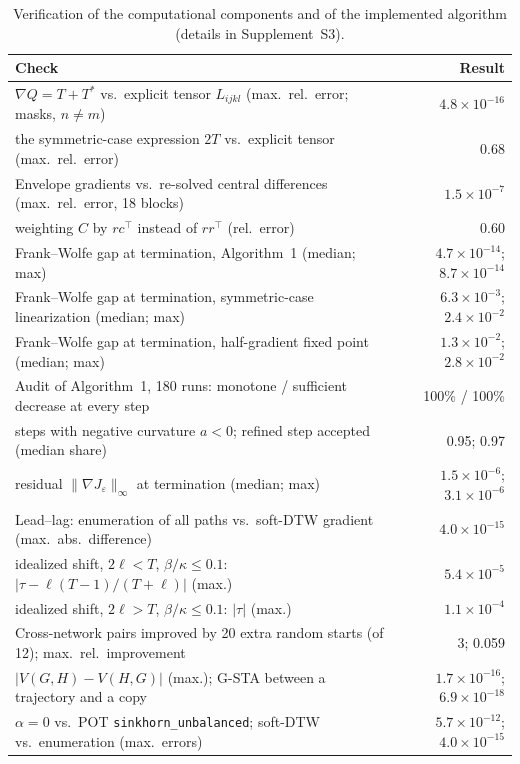 \documentclass[12pt]{article}
\theoremstyle{definition}
\begin{document}
\begin{table}[hp]
\caption{Verification of the computational components and of the implemented algorithm (details in Supplement~S3).}\label{tab:verif}
\centering\scriptsize
\begin{tabular}{lr}
\toprule
Check & Result\\
\midrule
$\nabla Q=T+T^\ast$ vs.\ explicit tensor $L_{ijkl}$ (max.\ rel.\ error; masks, $n\ne m$) & $4.8\times10^{-16}$\\
\quad the symmetric-case expression $2T$ vs.\ explicit tensor (max.\ rel.\ error) & 0.68\\
Envelope gradients vs.\ re-solved central differences (max.\ rel.\ error, 18 blocks) & $1.5\times10^{-7}$\\
\quad weighting $C$ by $rc^\top$ instead of $rr^\top$ (rel.\ error) & 0.60\\
Frank--Wolfe gap at termination, Algorithm~1 (median; max) & $4.7\times10^{-14}$; $8.7\times10^{-14}$\\
Frank--Wolfe gap at termination, symmetric-case linearization (median; max) & $6.3\times10^{-3}$; $2.4\times10^{-2}$\\
Frank--Wolfe gap at termination, half-gradient fixed point (median; max) & $1.3\times10^{-2}$; $2.8\times10^{-2}$\\
Audit of Algorithm~1, 180 runs: monotone / sufficient decrease at every step & 100\% / 100\%\\
\quad steps with negative curvature $a<0$; refined step accepted (median share) & 0.95; 0.97\\
\quad residual $\|\nabla J_\varepsilon\|_\infty$ at termination (median; max) & $1.5\times10^{-6}$; $3.1\times10^{-6}$\\
Lead--lag: enumeration of all paths vs.\ soft-DTW gradient (max.\ abs.\ difference) & $4.0\times10^{-15}$\\
\quad idealized shift, $2\ell<T$, $\beta/\kappa\le0.1$: $|\tau-\ell(T-1)/(T+\ell)|$ (max.) & $5.4\times10^{-5}$\\
\quad idealized shift, $2\ell>T$, $\beta/\kappa\le0.1$: $|\tau|$ (max.) & $1.1\times10^{-4}$\\
Cross-network pairs improved by 20 extra random starts (of 12); max.\ rel.\ improvement & 3; 0.059\\
$|V(G,H)-V(H,G)|$ (max.); G-STA between a trajectory and a copy & $1.7\times10^{-16}$; $6.9\times10^{-18}$\\
$\alpha=0$ vs.\ POT \texttt{sinkhorn\_unbalanced}; soft-DTW vs.\ enumeration (max.\ errors) & $5.7\times10^{-12}$; $4.0\times10^{-15}$\\

\end{tabular}
\end{table}
\end{document}
